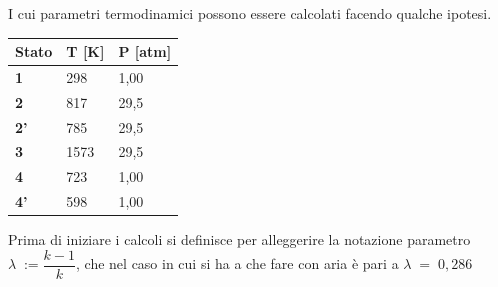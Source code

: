 \documentclass[a4paper, twoside, 12pt]{report}
\begin{document}
I cui parametri termodinamici possono essere calcolati facendo qualche ipotesi.
\begin{center}
	\begin{tabular}{| l || l | l |}
		\hline
		\textbf{Stato} & \textbf{T [K]} & \textbf{P [atm]}\\ 
		\hline
		\textbf{1} & 298 & 1,00\\ 
		\hline
		\textbf{2} & 817 & 29,5\\
		\hline
		\textbf{2'} & 785 & 29,5\\
		\hline
		\textbf{3} & 1573 & 29,5\\
		\hline
		\textbf{4} & 723 & 1,00\\
		\hline
		\textbf{4'} & 598 & 1,00\\
		\hline
	\end{tabular}
\end{center}
Prima di iniziare i calcoli si definisce per alleggerire la notazione parametro $\lambda\;:=\dfrac{k-1}{k}$, che nel caso in cui si ha a che fare con aria è pari a $\lambda\;=\;0,286$
\end{document}
